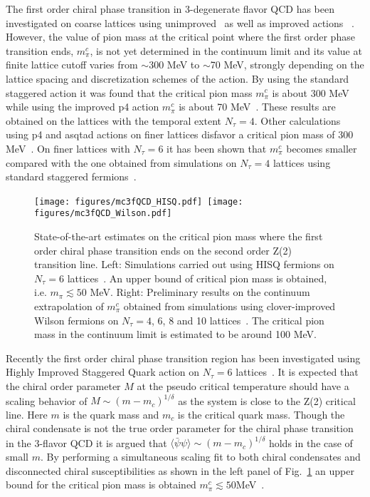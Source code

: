 \documentclass{PoS}
\begin{document}
The first order chiral phase transition in 3-degenerate flavor QCD has been investigated on 
coarse lattices using unimproved~\cite{Christ:2003jk, deForcrand:2003ut,deForcrand:2007rq,Smith:2011pm} as well as improved actions
~\cite{Karsch:2001nf,Schmidt:2002uk,Karsch:2003va, Bernard:2004je,Cheng:2006aj,Endrodi:2007gc,Jin:2014hea,Varnhorst:2015lea}.
However, the value of pion mass at the critical point where the first order phase transition ends, $m_\pi^c$, is 
not yet determined in the continuum limit and its value at finite lattice cutoff varies from $\sim$300 MeV to $\sim$70 MeV, 
strongly depending on the lattice spacing and discretization schemes of the action.
By using the standard staggered action it was found that the critical pion mass $m_\pi^c$ is about 300 MeV\cite{Christ:2003jk, deForcrand:2003ut} while  
using the improved p4 action $m_\pi^c$ is about 70 MeV~\cite{Karsch:2003va}. These results are obtained on the lattices with the 
temporal extent $N_{\tau}=4$. Other calculations using p4 and asqtad actions on finer lattices disfavor a critical pion mass of 300 MeV~\cite{Cheng:2006aj,Bernard:2004je}.
On finer lattices with $N_{\tau}=6$ it has been shown that $m_\pi^c$ becomes smaller compared 
with the one obtained from simulations on $N_{\tau}=4$ lattices using standard staggered fermions~\cite{deForcrand:2007rq}.  

\begin{figure}[htp]
\begin{center}
\texttt{[image: figures/mc3fQCD\_HISQ.pdf]}~\texttt{[image: figures/mc3fQCD\_Wilson.pdf]}
\end{center}
\caption{State-of-the-art estimates on the critical pion mass where the first order chiral phase transition ends on the second order Z(2) transition line. Left: Simulations carried out using HISQ fermions on $N_\tau=6$ lattices~\cite{Bazavov:2017xul}. An upper bound of critical pion
mass is obtained, i.e. $m_\pi\lesssim50$ MeV. 
Right: Preliminary results on the continuum extrapolation of $m_\pi^c$ obtained from simulations using clover-improved Wilson fermions on $N_\tau=4$, 6, 8 and 10 lattices~\cite{Takeda:2016vfj}. The critical pion mass in the continuum limit
is estimated to be around 100 MeV.}
\label{fig:mc3fQCD}
\end{figure}

Recently the first order chiral phase transition region has been investigated using Highly Improved Staggered Quark action on $N_\tau=6$ lattices~\cite{Bazavov:2017xul}.
It is expected that the chiral order parameter $M$ at the pseudo critical temperature  should have a scaling behavior of $M\sim(m-m_c)^{1/\delta}$ as the system is close to the Z(2) critical line. Here $m$ is the quark mass and $m_c$
is the critical quark mass. Though the chiral condensate is not the true order parameter for the chiral phase transition in the 3-flavor QCD it is argued that $\langle\bar{\psi}\psi\rangle\sim(m-m_c)^{1/\delta}$ 
holds in the case of small $m$. By performing a simultaneous
scaling fit to both chiral condensates and disconnected chiral susceptibilities as shown in the left panel of Fig.~\ref{fig:mc3fQCD} an upper bound for the critical pion mass is obtained $m_\pi^c\lesssim 50$MeV~\cite{Bazavov:2017xul}.
\end{document}
